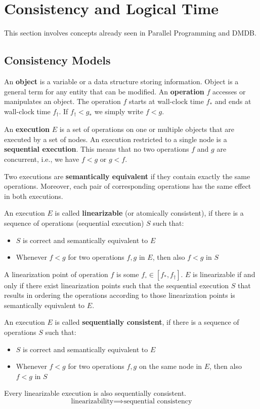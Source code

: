 \section{Consistency and Logical Time}

This section involves concepts already seen in Parallel Programming and DMDB.


\subsection{Consistency Models}

An \textbf{object} is a variable or a data structure storing information. Object is a general term for any entity that can be modified. An \textbf{operation} $f$ accesses or manipulates an object. The operation $f$ starts at wall-clock time $f_*$ and ends at wall-clock time $f_\dagger$. If $f_\dagger < g_*$ we simply write $f < g$. \medskip

An \textbf{execution} $E$ is a set of operations on one or multiple objects that are executed by a set of nodes. An execution restricted to a single node is a \textbf{sequential execution}. This means that no two operations $f$ and $g$ are concurrent, i.e., we have $f < g$ or $g < f$. \medskip

Two executions are \textbf{semantically equivalent} if they contain exactly the same operations. Moreover, each pair of corresponding operations has the same effect in both executions. \medskip

An execution $E$ is called \textbf{linearizable} (or atomically consistent), if there is a sequence of operations (sequential execution) $S$ such that:
\begin{itemize}
	\item $S$ is correct and semantically equivalent to $E$
	\item Whenever $f < g$ for two operations $f,g$ in $E$, then also $f < g$ in $S$
\end{itemize}

A linearization point of operation $f$ is some $f_\circ \in [f_* , f_\dagger]$. $E$ is linearizable if and only if there exist linearization points such that the sequential execution $S$ that results in ordering the operations according to those linearization points is semantically equivalent to $E$. \medskip

An execution $E$ is called \textbf{sequentially consistent}, if there is a sequence of operations $S$ such that:
\begin{itemize}
	\item $S$ is correct and semantically equivalent to $E$
	\item Whenever $f < g$ for two operations $f,g$ on the same node in $E$, then also $f < g$ in $S$
\end{itemize}
Every linearizable execution is also sequentially consistent.
$$\text{linearizability} \implies \text{sequential consistency}$$

